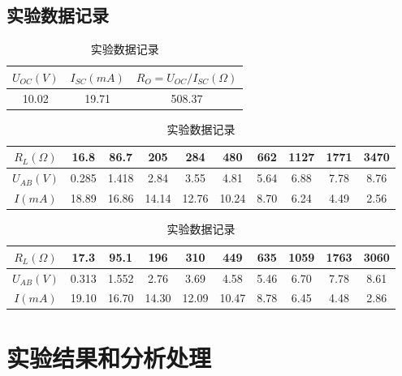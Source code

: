 \documentclass{../source/Experiment}
\begin{document}
        \subsection{实验数据记录}
            \newpage
            \begin{table}[htbp]
                \begin{center}
                    \caption{实验数据}
                    \begin{tabular}{|c|c|c|}
                        \hline
                        $U_{OC}(V)$ & $I_{SC}(mA)$ & $R_O = U_{OC}/I_{SC}(\Omega)$ \\           
                        \hline
                        10.02 & 19.71 & 508.37 \\
                        \hline
                    \end{tabular}
                    \caption{实验数据记录}
                    \begin{tabular}{|c|c|c|c|c|c|c|c|c|c|}
                        \hline
                        $R_L(\Omega)$ & 16.8 & 86.7 & 205 & 284 & 480 & 662 & 1127 & 1771 & 3470 \\
                        \hline
                        $U_{AB}(V)$ & 0.285 & 1.418 & 2.84 & 3.55 & 4.81 & 5.64 & 6.88 & 7.78 & 8.76 \\
                        \hline
                        $I(mA)$ & 18.89 & 16.86 & 14.14 & 12.76 & 10.24 & 8.70 & 6.24 & 4.49 & 2.56 \\
                        \hline
                    \end{tabular}
                    \caption{实验数据记录}
                    \begin{tabular}{|c|c|c|c|c|c|c|c|c|c|}
                        \hline
                        $R_L(\Omega)$ & 17.3 & 95.1 & 196 & 310 & 449 & 635 & 1059 & 1763 & 3060 \\
                        \hline
                        $U_{AB}(V)$ & 0.313 & 1.552 & 2.76 & 3.69 & 4.58 & 5.46 & 6.70 & 7.78 & 8.61 \\
                        \hline
                        $I(mA)$ & 19.10 & 16.70 & 14.30 & 12.09 & 10.47 & 8.78 & 6.45 & 4.48 & 2.86 \\
                        \hline
                    \end{tabular}
                \end{center}
            \end{table}
    \section{实验结果和分析处理}
\end{document}
